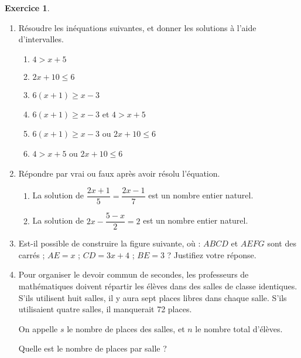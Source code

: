 \documentclass[12pt]{article}
\theoremstyle{definition}
\newtheorem{exercice}{Exercice}
\begin{document}
\setcounter{exercice}{3}
\begin{exercice}~

\begin{enumerate}
  \item R\'esoudre les in\'equations suivantes, et donner les solutions \`a l'aide d'intervalles.
    \begin{multicols}{2}
      \begin{enumerate}
        \item $4>x+5$
        \item $2x+10\leq6$
        \item $6(x+1)\geq x-3$
        \item $6(x+1)\geq x-3$ et $4>x+5$
        \item $6(x+1)\geq x-3$ ou $2x+10\leq6$
        \item $4>x+5$ ou $2x+10\leq6$
      \end{enumerate}
    \end{multicols}

  \item R\'epondre par vrai ou faux apr\`es avoir r\'esolu l'\'equation.
    \begin{enumerate}
      \item La solution de $\dfrac{2x+1}{5}=\dfrac{2x-1}{7}$ est un nombre entier naturel.
      \item La solution de $2x-\dfrac{5-x}{2}=2$ est un nombre entier naturel.
    \end{enumerate}

  \item Est-il possible de construire la figure suivante, o\`u :
      $ABCD$ et $AEFG$ sont des carr\'es ;
      $AE=x$ ;
      $CD=3x+4$ ;
      $BE = 3$ ?
    Justifiez votre r\'eponse.

    \begin{center}
    \end{center}

  \item Pour organiser le devoir commun de secondes, les professeurs de
    math\'ematiques doivent r\'epartir les \'el\`eves dans des salles de classe
    identiques. S'ils utilisent huit salles, il y aura sept places libres dans
    chaque salle. S'ils utilisaient quatre salles, il manquerait 72 places.

    On appelle $s$ le nombre de places des salles, et $n$ le nombre total d'\'el\`eves.

    Quelle est le nombre de places par salle ?

\end{enumerate}
\end{exercice}
\end{document}
